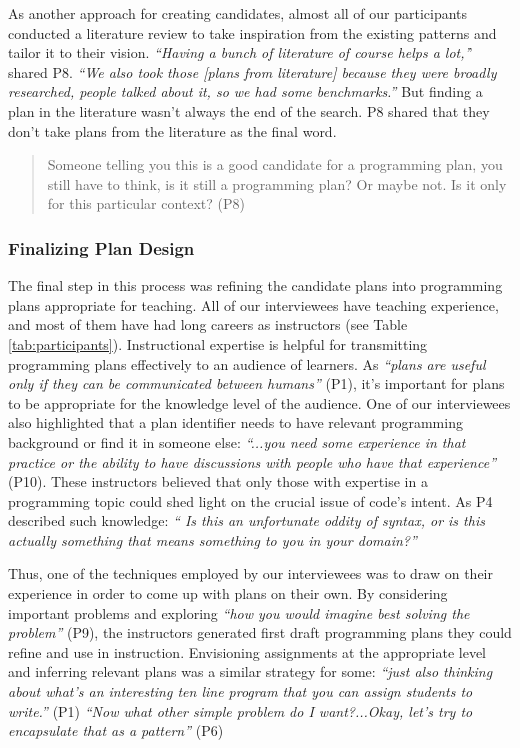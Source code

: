 As another approach for creating candidates, almost all of our participants conducted a literature review to take inspiration from the existing patterns and tailor it to their vision. \textit{``Having a bunch of literature of course helps a lot,'}' shared P8. \textit{``We also took those [plans from literature] because they were broadly researched, people talked about it, so we had some benchmarks.''} But finding a plan in the literature wasn't always the end of the search. P8 shared that they don't take plans from the literature as the final word.
\begin{quote}
Someone telling you this is a good candidate for a programming plan, you still have to think, is it still a programming plan? Or maybe not. Is it only for this particular context? (P8)
\end{quote}

\subsubsection{Finalizing Plan Design}
\label{sec:individual-design}

The final step in this process was refining the candidate plans into programming plans appropriate for teaching.
All of our interviewees have teaching experience, and most of them have had long careers as instructors (see Table \ref{tab:participants}). Instructional expertise is helpful for transmitting programming plans effectively to an audience of learners. As \textit{``plans are useful only if they can be communicated between humans''} (P1), it's important for plans to be appropriate for the knowledge level of the audience. One of our interviewees also highlighted that a plan identifier needs to have relevant programming background or find it in someone else: \textit{``...you need some experience in that practice or the ability to have discussions with people who have that experience''} (P10).
These instructors believed that only those with expertise in a programming topic could shed light on the crucial issue of code's intent. As P4 described such knowledge: \textit{``
Is this an unfortunate oddity of syntax, or is this actually something that means something to you in your domain?''}

Thus, one of the techniques employed by our interviewees was to draw on their experience in order to come up with plans on their own. By considering important problems and exploring \textit{``how you would imagine best solving the problem''} (P9), the instructors generated first draft programming plans they could refine and use in instruction. Envisioning assignments at the appropriate level and inferring relevant plans was a similar strategy for some: \textit{``just also thinking about what's an interesting ten line program that you can assign students to write.''} (P1) \textit{``Now what other simple problem do I want?...Okay, let's try to encapsulate that as a pattern''} (P6)

